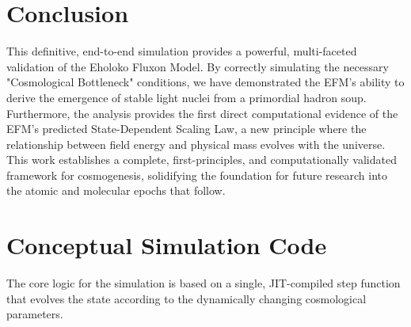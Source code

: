 \documentclass[11pt]{article}
\begin{document}
\begin{figure}[H]
    \label{fig:evolution_plot}
\end{figure}

\section{Conclusion}
This definitive, end-to-end simulation provides a powerful, multi-faceted validation of the Eholoko Fluxon Model. By correctly simulating the necessary "Cosmological Bottleneck" conditions, we have demonstrated the EFM's ability to derive the emergence of stable light nuclei from a primordial hadron soup. Furthermore, the analysis provides the first direct computational evidence of the EFM's predicted State-Dependent Scaling Law, a new principle where the relationship between field energy and physical mass evolves with the universe. This work establishes a complete, first-principles, and computationally validated framework for cosmogenesis, solidifying the foundation for future research into the atomic and molecular epochs that follow.

\appendix
\section{Conceptual Simulation Code}
The core logic for the simulation is based on a single, JIT-compiled step function that evolves the state according to the dynamically changing cosmological parameters.
\end{document}
